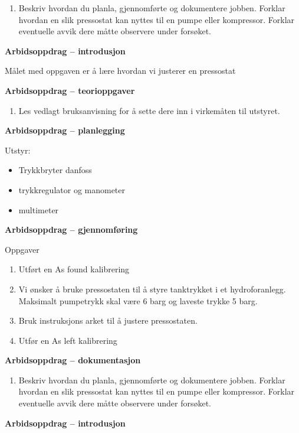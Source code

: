 \begin{enumerate}
	\item Beskriv hvordan du planla, gjennomførte og dokumentere jobben. Forklar hvordan en slik pressostat kan nyttes til en pumpe eller kompressor. Forklar eventuelle avvik dere måtte observere under forsøket. 
\end{enumerate}


\textbf{Arbidsoppdrag -- introdusjon}

Målet med oppgaven er å lære hvordan vi justerer en pressostat



\textbf{Arbidsoppdrag -- teorioppgaver}

\begin{enumerate}
	\item Les vedlagt bruksanvisning for å sette dere inn i virkemåten til utstyret.
\end{enumerate}
\textbf{Arbidsoppdrag -- planlegging}

Utstyr:
\begin{itemize}[noitemsep]
	\item Trykkbryter danfoss
	\item trykkregulator og manometer
	\item multimeter
\end{itemize}

\textbf{Arbidsoppdrag -- gjennomføring}

Oppgaver\begin{enumerate}
	\item Utført en As found kalibrering 
	\item Vi ønsker å bruke pressostaten til å styre tanktrykket i et hydroforanlegg. Maksimalt pumpetrykk skal være 6 barg og laveste trykke 5 barg. 
	\item Bruk instruksjons arket til å justere pressostaten.
	\item Utfør en As left kalibrering 
\end{enumerate}
\textbf{Arbidsoppdrag -- dokumentasjon}

\begin{enumerate}
	\item Beskriv hvordan du planla, gjennomførte og dokumentere jobben. Forklar hvordan en slik pressostat kan nyttes til en pumpe eller kompressor. Forklar eventuelle avvik dere måtte observere under forsøket. 
\end{enumerate}




\textbf{Arbidsoppdrag -- introdusjon}

